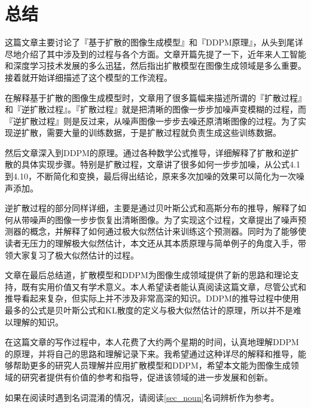 \section{总结}

这篇文章主要讨论了『基于扩散的图像生成模型』和『DDPM原理』，从头到尾详尽地介绍了其中涉及到的过程与各个方面。文章开篇先提了一下，近年来人工智能和深度学习技术发展的多么迅猛，然后指出扩散模型在图像生成领域是多么重要。接着就开始详细描述了这个模型的工作流程。

在解释基于扩散的图像生成模型时，文章用了很多篇幅来描述所谓的『扩散过程』和『逆扩散过程』。『扩散过程』就是把清晰的图像一步步加噪声变模糊的过程，而『逆扩散过程』则是反过来，从噪声图像一步步去噪还原清晰图像的过程。为了实现逆扩散，需要大量的训练数据，于是扩散过程就负责生成这些训练数据。

然后文章深入到DDPM\cite{hoDenoisingDiffusionProbabilistic2020a}的原理。通过各种数学公式推导，详细解释了扩散和逆扩散的具体实现步骤。特别是扩散过程，文章讲了很多如何一步步加噪，从公式4.1到4.10，不断简化和变换，最后得出结论，原来多次加噪的效果可以简化为一次噪声添加。

逆扩散过程的部分同样详细，主要是通过贝叶斯公式和高斯分布的推导，解释了如何从带噪声的图像一步步恢复出清晰图像。为了实现这个过程，文章提出了噪声预测器的概念，并解释了如何通过极大似然估计来训练这个预测器。同时为了能够使读者无压力的理解极大似然估计，本文还从其本质原理与简单例子的角度入手，带领大家复习了极大似然估计的过程。

文章在最后总结道，扩散模型和DDPM为图像生成领域提供了新的思路和理论支持，既有实用价值又有学术意义。本人希望读者能认真阅读这篇文章，尽管公式和推导看起来复杂，但实际上并不涉及非常高深的知识。DDPM的推导过程中使用最多的公式是贝叶斯公式和KL散度的定义与极大似然估计的原理，所以并不是难以理解的知识。

在这篇文章的写作过程中，本人花费了大约两个星期的时间，认真地理解DDPM的原理，并将自己的思路和理解记录下来。我希望通过这种详尽的解释和推导，能够帮助更多的研究人员理解并应用扩散模型和DDPM，希望本文能为图像生成领域的研究者提供有价值的参考和指导，促进该领域的进一步发展和创新。

如果在阅读时遇到名词混淆的情况，请阅读\ref{sec_noun}名词辨析作为参考。